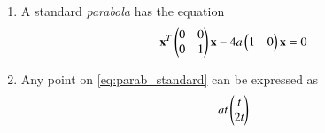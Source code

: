 \renewcommand{\theequation}{\theenumi}
\begin{enumerate}[label=\arabic*.,ref=\thesubsection.\theenumi]
%
\item A standard {\em parabola} has the equation  
\begin{align}
\label{eq:parab_standard}
\mathbf{x}^T\begin{pmatrix}0 & 0\\0 & 1\end{pmatrix}\mathbf{x}-4a\begin{pmatrix}1 & 0 \end{pmatrix}\mathbf{x}= 0 
\end{align}
\item Any point on \eqref{eq:parab_standard} can be expressed as
\begin{align}
\label{eq:parab_param}
at\begin{pmatrix}t \\ 2t \end{pmatrix}
\end{align}
\end{enumerate}

